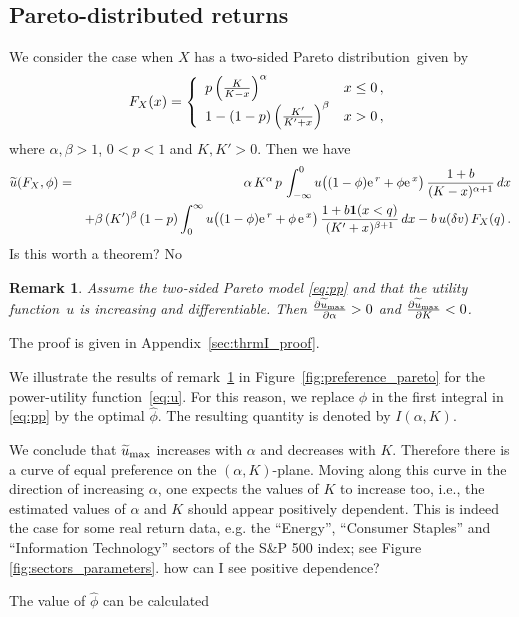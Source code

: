 \documentclass[11pt,a4]{amsart}
\newcommand{\pd}{\partial}
\newcommand{\red}{\color{darkred}}
\newcommand{\blue}{\color{darkblue}}
\newcommand{\ex}{{\rm e}\,}
\newtheorem{remark}[lemma]{Remark}
\newcommand{\beam}{\begin{eqnarray}}
\newcommand{\eeam}{\end{eqnarray}\noindent}
\newcommand{\wt}{\widetilde}
\newcommand{\fct}{function}
\newcommand{\ds}{distribution}
\newcommand{\1}{{\mathbf 1}}
\begin{document}
\subsection{Pareto-distributed returns}
We consider the case when $X$ has a two-sided Pareto \ds\ given by
\beam\label{eq:pareto}
  F_X(x) = \left\{
  \begin{array}{ll}
    p \left(
    {K \over K - x}
    \right)^\alpha & x \leq 0 \,,\\
    1 - (1 - p) \left(
    {K' \over K' + x}
    \right)^\beta & x > 0\,,
  \end{array}
  \right.
\eeam
where 
$\alpha, \beta > 1$, $0 < p < 1$ and $K,K' > 0$. Then we have
\beam\label{eq:xxie1.0}
 \wt u(F_X,\phi)\nonumber
  &=&
  \alpha\, K^\alpha\,  p\,
  \int_{-\infty}^0
  u\big( (1 - \phi) \ex^r + \phi \ex^x \big)\,
  {1 + b \over (K - x)^{\alpha + 1}} \,dx\\
    &&+
  \beta \,(K')^\beta\, (1 - p)
  \int_{0}^\infty
  u\big( (1 - \phi) \ex^r + \phi\, \ex^x \big)\,
  {1 + b \1(x < q) \over (K' + x)^{\beta + 1}} \,dx 
  - b \,u(\delta v) \,F_X(q) \,.\label{eq:pp}
\eeam
    {\red Is this worth a theorem?}
    {\blue No}
\begin{remark}\label{thrm:I}
 Assume the two-sided Pareto model \eqref{eq:pp} and that the utility \fct\ $u$ is increasing and differentiable. Then
$\frac{\pd \wt u_{\rm max}}{\pd \alpha} > 0$ and $\frac{\pd \wt u_{\rm max}}{\pd K} < 0$.
\end{remark}
The proof is given in Appendix~\ref{sec:thrmI_proof}. 
\par
We illustrate the results of remark~\ref{thrm:I} in Figure~\ref{fig:preference_pareto} for the power-utility
\fct\ \eqref{eq:u}.
For this reason, we replace $\phi$ in the first integral in \eqref{eq:pp} by the optimal $\hat\phi$. The resulting
quantity is denoted by $I(\alpha, K)$.
\par
We conclude that
$\wt u_{\rm max}$ increases with $\alpha$ and decreases with $K$. Therefore there is a curve of
equal preference on the $(\alpha, K)$-plane. Moving along this
curve in the direction of increasing $\alpha$, one expects the values
of $K$ to increase too, i.e., the estimated values of $\alpha$ and $K$
should appear positively dependent. This is indeed the case for some
real return data, e.g. the ``Energy'', ``Consumer Staples'' and
``Information Technology'' sectors of the S\&P 500 index; see 
Figure \ref{fig:sectors_parameters}. {\red how can I see positive dependence?}
\par
The value of $\hat\phi$ can be calculated
\end{document}

